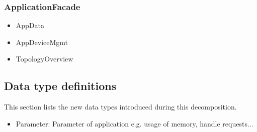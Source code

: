     \subsubsection{ApplicationFacade}
        \begin{itemize}
            \item AppData
            \item AppDeviceMgmt
            \item TopologyOverview
        \end{itemize}


\subsection{Data type definitions}
    This section lists the new data types introduced during this decomposition.

    \begin{itemize}
        \item Parameter: Parameter of application e.g. usage of memory, handle requests...
    \end{itemize}
